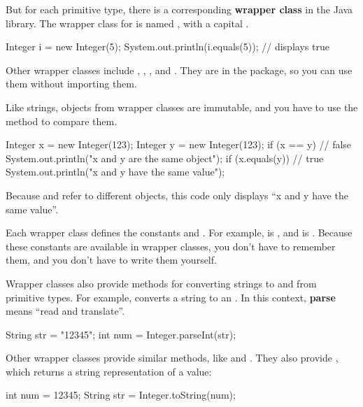 But for each primitive type, there is a corresponding {\bf wrapper class} in the Java library.
The wrapper class for  is named , with a capital .

\begin{code}
Integer i = new Integer(5);
System.out.println(i.equals(5));  // displays true
\end{code}

Other wrapper classes include , , , and .
They are in the  package, so you can use them without importing them.

Like strings, objects from wrapper classes are immutable, and you have to use the  method to compare them.

\begin{code}
Integer x = new Integer(123);
Integer y = new Integer(123);
if (x == y) {                     // false
    System.out.println("x and y are the same object");
}
if (x.equals(y)) {                // true
    System.out.println("x and y have the same value");
}
\end{code}

Because  and  refer to different objects, this code only displays ``x and y have the same value''.

Each wrapper class defines the constants  and .
For example,  is , and  is .
Because these constants are available in wrapper classes, you don't have to remember them, and you don't have to write them yourself.


Wrapper classes also provide methods for converting strings to and from primitive types.
For example,  converts a string to an .
In this context, {\bf parse} means ``read and translate''.

\begin{code}
String str = "12345";
int num = Integer.parseInt(str);
\end{code}

Other wrapper classes provide similar methods, like  and .
They also provide , which returns a string representation of a value:

\begin{code}
int num = 12345;
String str = Integer.toString(num);
\end{code}

